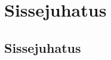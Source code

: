 \documentclass[12pt]{article}
\newcommand{\TODO}{\todo[inline]}
\newcommand{\newlinespacer}{{%
    \newline
    \newline
  }}%
\begin{document}
  
  {\EstInfo}
  {\EngInfo}
  
  
  \newpage
  \tableofcontents
  
  
  
  
  \newpage
  \section{Sissejuhatus}
  
  

  \subsection{Sissejuhatus}

\end{document}
